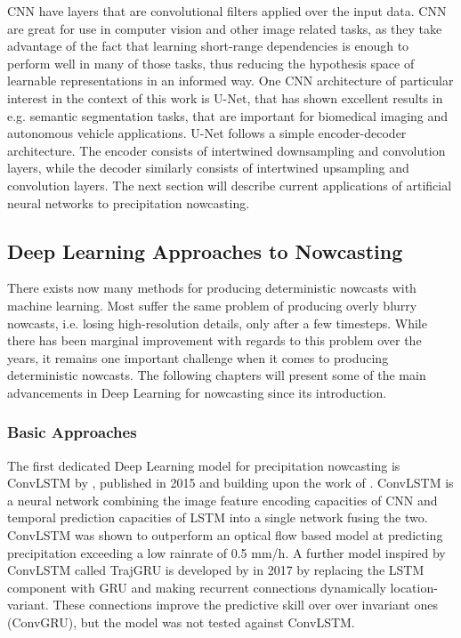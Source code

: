 CNN have layers that are convolutional filters applied over the input data. CNN are great for use in computer vision and other image related tasks, as they take advantage of the fact that learning short-range dependencies is enough to perform well in many of those tasks, thus reducing the hypothesis space of learnable representations in an informed way. One CNN architecture of particular interest in the context of this work is U-Net, that has shown excellent results in e.g. semantic segmentation tasks, that are important for biomedical imaging and autonomous vehicle applications. U-Net follows a simple encoder-decoder architecture. The encoder consists of intertwined downsampling and convolution layers, while the decoder similarly consists of intertwined upsampling and convolution layers. The next section will describe current applications of artificial neural networks to precipitation nowcasting.



\subsection{Deep Learning Approaches to Nowcasting}


There exists now many methods for producing deterministic nowcasts with machine learning. Most suffer the same problem of producing overly blurry nowcasts, i.e. losing high-resolution details, only after a few timesteps. While there has been marginal improvement with regards to this problem over the years, it remains one important challenge when it comes to producing deterministic nowcasts. The following chapters will present some of the main advancements in Deep Learning for nowcasting since its introduction.

\subsubsection*{Basic Approaches}
 
The first dedicated Deep Learning model for precipitation nowcasting is ConvLSTM by \citet{shi_convolutional_2015}, published in 2015 and building upon the work of \citet{oh_action-conditional_2015}. ConvLSTM is a neural network combining the image feature encoding capacities of CNN and  temporal prediction capacities of LSTM into a single network fusing the two. ConvLSTM was shown to outperform an optical flow based model at predicting precipitation exceeding a low rainrate of 0.5 mm/h. 
A further model inspired by ConvLSTM called TrajGRU is developed by \citet{shi_deep_2017} in 2017 by replacing the LSTM component with GRU and making recurrent connections dynamically location-variant. These connections improve the predictive skill over over invariant ones (ConvGRU), but the model was not tested against ConvLSTM. 

